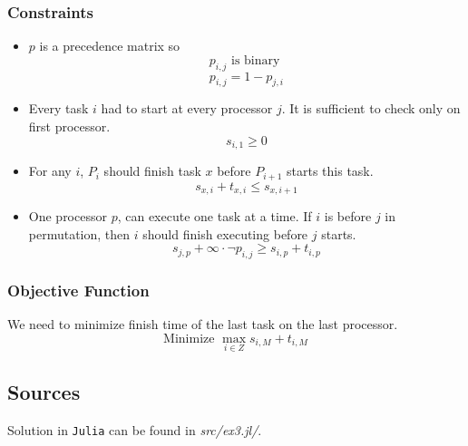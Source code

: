 \subsubsection*{Constraints}
\begin{itemize}
    \item $p$ is a precedence matrix so
    $$p_{i,j} \textrm{ is binary }$$
    $$p_{i,j} = 1 - p_{j,i}$$
    \item Every task $i$ had to start at every processor $j$. It is sufficient to check only on first processor.
    $$ s_{i, 1} \geqslant 0$$
    \item For any $i$, $P_i$ should finish task $x$ before $P_{i+1}$ starts this task.
    $$s_{x, i} + t_{x, i} \leqslant s_{x, i+1}$$
    \item One processor $p$, can execute one task at a time. 
    If $i$ is before $j$ in permutation, then $i$ should finish executing before $j$ starts.
    $$s_{j, p} + \infty \cdot \neg p_{i,j} \geqslant s_{i,p} + t_{i,p} $$
    
\end{itemize}
\subsubsection*{Objective Function}
We need to minimize finish time of the last task on the last processor.
$$\textrm{Minimize } \max_{i \in Z}{s_{i, M} + t_{i, M}}$$
\subsection{Sources}
Solution in \texttt{Julia} can be found in \textit{src/ex3.jl/}.

